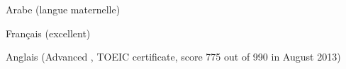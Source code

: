 \begin{cventries}
  \cventry
    {}
    {}
    {}
    {}
    {
      \begin{cvitems}
        \item {Arabe (langue maternelle)}
        \item {Français  (excellent)}
        \item {Anglais (Advanced , TOEIC certificate, score 775 out of 990 in August 2013)}
      \end{cvitems}
    }
\end{cventries}

